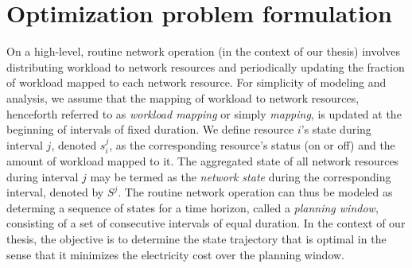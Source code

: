 
\section{Optimization problem formulation}
\label{sec:framework:optimization}
On a high-level, routine network operation (in the context of our thesis) involves distributing workload to network resources and periodically updating the fraction of workload mapped to each network resource. For simplicity of modeling and analysis, we assume that the mapping of workload to network resources, henceforth referred to as \textit{workload mapping} or simply \textit{mapping}, is updated at the beginning of intervals of fixed duration. We define resource $i$'s state during interval $j$, denoted $s_i^j$, as the corresponding resource's status (on or off) and the amount of workload mapped to it. The aggregated state of all network resources during interval $j$ may be termed as the \textit{network state} during the corresponding interval, denoted by $S^j$. The routine network operation can thus be modeled as determing a sequence of states for a time horizon, called a \textit{planning window}, consisting of a set of consecutive intervals of equal duration. In the context of our thesis, the objective is to determine the state trajectory that is optimal in the sense that it minimizes the electricity cost over the planning window. %

